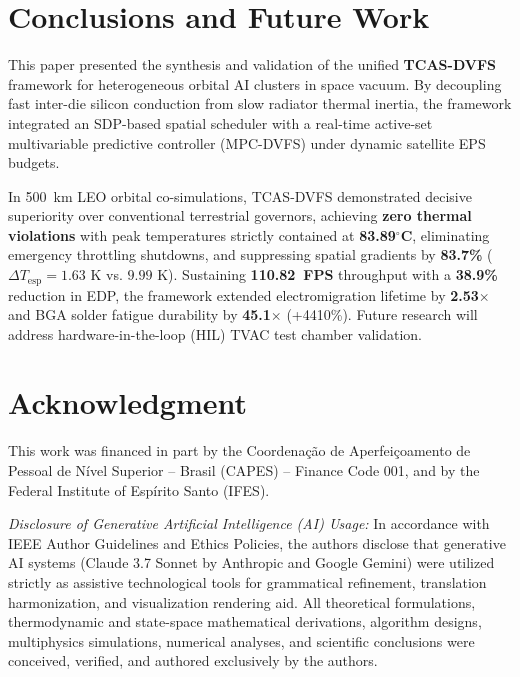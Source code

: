 \documentclass[journal]{IEEEtran}
\begin{document}
\section{Conclusions and Future Work}
This paper presented the synthesis and validation of the unified \textbf{TCAS-DVFS} framework for heterogeneous orbital AI clusters in space vacuum. By decoupling fast inter-die silicon conduction from slow radiator thermal inertia, the framework integrated an SDP-based spatial scheduler with a real-time active-set multivariable predictive controller (MPC-DVFS) under dynamic satellite EPS budgets.

In 500~km LEO orbital co-simulations, TCAS-DVFS demonstrated decisive superiority over conventional terrestrial governors, achieving \textbf{zero thermal violations} with peak temperatures strictly contained at \textbf{83.89$^\circ$C}, eliminating emergency throttling shutdowns, and suppressing spatial gradients by \textbf{83.7\%} ($\Delta T_{\text{esp}} = 1.63\text{ K}$ vs. $9.99\text{ K}$). Sustaining \textbf{110.82~FPS} throughput with a \textbf{38.9\%} reduction in EDP, the framework extended electromigration lifetime by \textbf{2.53$\times$} and BGA solder fatigue durability by \textbf{45.1$\times$} (+4410\%). Future research will address hardware-in-the-loop (HIL) TVAC test chamber validation.

\section*{Acknowledgment}
This work was financed in part by the Coordena\c{c}\~ao de Aperfei\c{c}oamento de Pessoal de N\'ivel Superior -- Brasil (CAPES) -- Finance Code 001, and by the Federal Institute of Esp\'irito Santo (IFES).

\textit{Disclosure of Generative Artificial Intelligence (AI) Usage:} In accordance with IEEE Author Guidelines and Ethics Policies, the authors disclose that generative AI systems (Claude 3.7 Sonnet by Anthropic and Google Gemini) were utilized strictly as assistive technological tools for grammatical refinement, translation harmonization, and visualization rendering aid. All theoretical formulations, thermodynamic and state-space mathematical derivations, algorithm designs, multiphysics simulations, numerical analyses, and scientific conclusions were conceived, verified, and authored exclusively by the authors.
\end{document}
